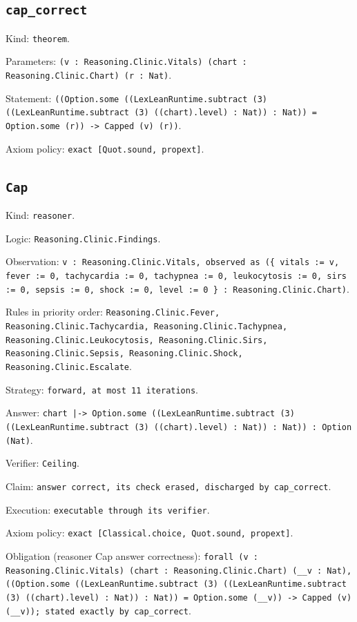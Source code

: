 \documentclass[11pt]{article}
\begin{document}
\subsection*{\texttt{cap\_correct}}
\noindent Kind: \texttt{theorem}.\par
\noindent Parameters: \texttt{(v : Reasoning.Clinic.Vitals) (chart : Reasoning.Clinic.Chart) (r : Nat)}.\par
\noindent Statement: \texttt{((Option.some ((LexLeanRuntime.subtract (3) ((LexLeanRuntime.subtract (3) ((chart).level) : Nat)) : Nat)) = Option.some (r)) -> Capped (v) (r))}.\par
\noindent Axiom policy: \texttt{exact [Quot.sound, propext]}.\par
\subsection*{\texttt{Cap}}
\noindent Kind: \texttt{reasoner}.\par
\noindent Logic: \texttt{Reasoning.Clinic.Findings}.\par
\noindent Observation: \texttt{v : Reasoning.Clinic.Vitals, observed as (\{ vitals := v, fever := 0, tachycardia := 0, tachypnea := 0, leukocytosis := 0, sirs := 0, sepsis := 0, shock := 0, level := 0 \} : Reasoning.Clinic.Chart)}.\par
\noindent Rules in priority order: \texttt{Reasoning.Clinic.Fever, Reasoning.Clinic.Tachycardia, Reasoning.Clinic.Tachypnea, Reasoning.Clinic.Leukocytosis, Reasoning.Clinic.Sirs, Reasoning.Clinic.Sepsis, Reasoning.Clinic.Shock, Reasoning.Clinic.Escalate}.\par
\noindent Strategy: \texttt{forward, at most 11 iterations}.\par
\noindent Answer: \texttt{chart |-> Option.some ((LexLeanRuntime.subtract (3) ((LexLeanRuntime.subtract (3) ((chart).level) : Nat)) : Nat)) : Option (Nat)}.\par
\noindent Verifier: \texttt{Ceiling}.\par
\noindent Claim: \texttt{answer correct, its check erased, discharged by cap\_correct}.\par
\noindent Execution: \texttt{executable through its verifier}.\par
\noindent Axiom policy: \texttt{exact [Classical.choice, Quot.sound, propext]}.\par
\noindent Obligation (reasoner Cap answer correctness): \texttt{forall (v : Reasoning.Clinic.Vitals) (chart : Reasoning.Clinic.Chart) (\_\_v : Nat), ((Option.some ((LexLeanRuntime.subtract (3) ((LexLeanRuntime.subtract (3) ((chart).level) : Nat)) : Nat)) = Option.some (\_\_v)) -> Capped (v) (\_\_v)); stated exactly by cap\_correct}.\par
\end{document}

